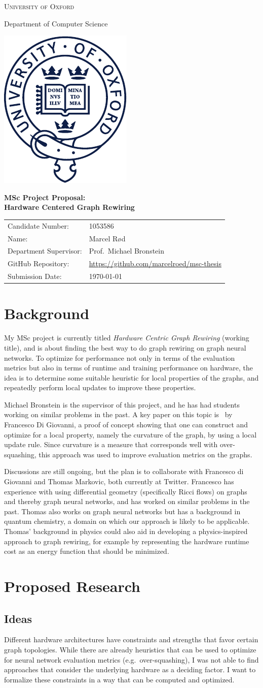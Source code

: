 \documentclass[11pt]{article}
\def\crest{{\includegraphics{title/beltcrest.pdf}}}
\renewcommand{\maketitle}{%
    \null
    \renewcommand{\footnotesize}{\small}
    \renewcommand{\footnoterule}{\relax}
    \thispagestyle{empty}
    \begin{center}
        \vspace*{15mm}
        { \LARGE {\textsc{University of Oxford}} \par}
        {\large \vspace*{4mm}}
        {\large Department of Computer Science \par}
        {\large \vspace*{10mm} {\crest \par} \vspace*{15mm}}
        { \LARGE {\bfseries {MSc Project Proposal:\\ Hardware Centered Graph Rewiring}} \par}
        {\large \vspace*{15mm}}
        \bgroup
        \def\arraystretch{1.2}%
        \begin{tabular}{l l}
            Candidate Number:      & 1053586\\
            Name: & Marcel R\o d \\
            Department Supervisor: & Prof.\ Michael Bronstein \\
            GitHub Repository: & \href{https://github.com/marcelroed/msc-thesis}{https://github.com/marcelroed/msc-thesis} \\
            Submission Date: & \today \\
        \end{tabular}
        \egroup
    \end{center}
    \vfill\null}
\begin{document}
    \maketitle
    \clearpage
    \section*{Background}
    My MSc project is currently titled \textit{Hardware Centric Graph Rewiring} (working title), and is about finding the best way to do graph rewiring on graph neural networks.
    To optimize for performance not only in terms of the evaluation metrics but also in terms of runtime and training performance on hardware, the idea is to determine some suitable heuristic for local properties of the graphs, and repeatedly perform local updates to improve these properties.

    Michael Bronstein is the supervisor of this project, and he has had students working on similar problems in the past.
    A key paper on this topic is~\cite{toppingUnderstandingOversquashingBottlenecks2022} by Francesco Di Giovanni, a proof of concept showing that one can construct and optimize for a local property, namely the curvature of the graph, by using a local update rule.
    Since curvature is a measure that corresponds well with over-squashing, this approach was used to improve evaluation metrics on the graphs.

    Discussions are still ongoing, but the plan is to collaborate with Francesco di Giovanni and Thomas Markovic, both currently at Twitter.
    Francesco has experience with using differential geometry (specifically Ricci flows) on graphs and thereby graph neural networks, and has worked on similar problems in the past.
    Thomas also works on graph neural networks but has a background in quantum chemistry, a domain on which our approach is likely to be applicable.
    Thomas' background in physics could also aid in developing a physics-inspired approach to graph rewiring, for example by representing the hardware runtime cost as an energy function that should be minimized.

    \section*{Proposed Research}
    \subsection*{Ideas}
    Different hardware architectures have constraints and strengths that favor certain graph topologies.
    While there are already heuristics that can be used to optimize for neural network evaluation metrics (e.g.\ over-squashing), I was not able to find approaches that consider the underlying hardware as a deciding factor.
    I want to formalize these constraints in a way that can be computed and optimized.
\end{document}
